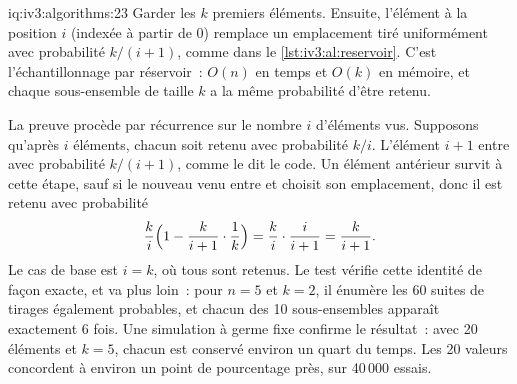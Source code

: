 \begin{solution}{iq:iv3:algorithms:23}
Garder les $k$ premiers éléments. Ensuite, l'élément à la position $i$ (indexée à partir de 0) remplace un emplacement tiré uniformément avec probabilité $k/(i+1)$, comme dans le \cref{lst:iv3:al:reservoir}. C'est l'échantillonnage par réservoir~: $O(n)$ en temps et $O(k)$ en mémoire, et chaque sous-ensemble de taille $k$ a la même probabilité d'être retenu.
\label{lst:iv3:al:reservoir}

La preuve procède par récurrence sur le nombre $i$ d'éléments vus. Supposons qu'après $i$ éléments, chacun soit retenu avec probabilité $k/i$. L'élément $i+1$ entre avec probabilité $k/(i+1)$, comme le dit le code. Un élément antérieur survit à cette étape, sauf si le nouveau venu entre et choisit son emplacement, donc il est retenu avec probabilité
\[
\frac{k}{i}\Bigl(1 - \frac{k}{i+1} \cdot \frac{1}{k}\Bigr) = \frac{k}{i} \cdot \frac{i}{i+1} = \frac{k}{i+1}.
\]
Le cas de base est $i = k$, où tous sont retenus. Le test vérifie cette identité de façon exacte, et va plus loin~: pour $n = 5$ et $k = 2$, il énumère les 60 suites de tirages également probables, et chacun des 10 sous-ensembles apparaît exactement 6 fois. Une simulation à germe fixe confirme le résultat~: avec 20 éléments et $k = 5$, chacun est conservé environ un quart du temps. Les 20 valeurs concordent à environ un point de pourcentage près, sur 40\,000 essais.

\end{solution}

